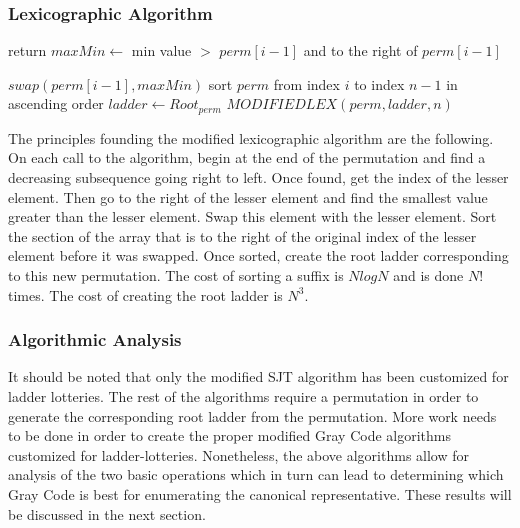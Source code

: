 \subsubsection{Lexicographic Algorithm}

\begin{algorithm}
  \begin{algorithmic}[1]
        \State return
      \EndIf
          \State $maxMin \gets $ min value $>$ $perm[i-1]$ and to the right of 
          $perm[i-1]$
          
                                  
          \State $swap(perm[i-1], maxMin)$
          \State sort $perm$ from index $i$ to index $n-1$ in ascending order
          \State $ladder \gets Root_{perm}$
          \State $MODIFIEDLEX(perm, ladder, n)$
        \EndIf
      \EndFor

    \EndFunction
  \end{algorithmic}
\end{algorithm}

The principles founding the modified lexicographic algorithm are the following.
On each call to the algorithm, begin at the end of the permutation and 
find a decreasing subsequence going right to left. Once found, get the index 
of the lesser element. Then go to the right of the lesser element and find the 
smallest value greater than the lesser element. Swap this element with the lesser element. 
Sort the section of the array that is to the right of the original index of the 
lesser element before it was swapped. Once sorted, create the root ladder corresponding 
to this new permutation. The cost of sorting a suffix is $Nlog{N}$ and is done $N!$ times.
The cost of creating the root ladder is $N^{3}$.

\subsubsection{Algorithmic Analysis}
  It should be noted that only the modified SJT algorithm has been customized for ladder lotteries. The rest of the algorithms 
  require a permutation in order to generate the corresponding root ladder from the permutation. More work needs to be done in 
  order to create the proper modified Gray Code algorithms customized for ladder-lotteries. 
  Nonetheless, the above algorithms allow for analysis of the two basic operations which in turn can lead to determining which Gray Code is best 
  for enumerating the canonical representative. These results will be discussed in the next section.